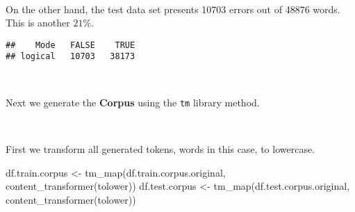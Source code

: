 \documentclass[
]{article}
\newenvironment{Shaded}{\begin{snugshade}}{\end{snugshade}}
\newcommand{\AttributeTok}[1]{\textcolor[rgb]{0.77,0.63,0.00}{#1}}
\newcommand{\FunctionTok}[1]{\textcolor[rgb]{0.00,0.00,0.00}{#1}}
\newcommand{\NormalTok}[1]{#1}
\newcommand{\OtherTok}[1]{\textcolor[rgb]{0.56,0.35,0.01}{#1}}
\newcommand{\SpecialCharTok}[1]{\textcolor[rgb]{0.00,0.00,0.00}{#1}}
\newcommand{\StringTok}[1]{\textcolor[rgb]{0.31,0.60,0.02}{#1}}
\begin{document}
~

On the other hand, the test data set presents 10703 errors out of 48876
words. This is another \(21\%\).

\begin{Shaded}
\end{Shaded}

\begin{verbatim}
##    Mode   FALSE    TRUE 
## logical   10703   38173
\end{verbatim}

~

Next we generate the \textbf{Corpus} using the \texttt{tm} library
method.

\begin{Shaded}
\end{Shaded}

~

First we transform all generated tokens, words in this case, to
lowercase.

\begin{Shaded}
\begin{Highlighting}[]
\NormalTok{df.train.corpus }\OtherTok{\textless{}{-}} \FunctionTok{tm\_map}\NormalTok{(df.train.corpus.original, }\FunctionTok{content\_transformer}\NormalTok{(tolower))}
\NormalTok{df.test.corpus }\OtherTok{\textless{}{-}} \FunctionTok{tm\_map}\NormalTok{(df.test.corpus.original, }\FunctionTok{content\_transformer}\NormalTok{(tolower))}
\end{Highlighting}
\end{Shaded}

~
\end{document}
